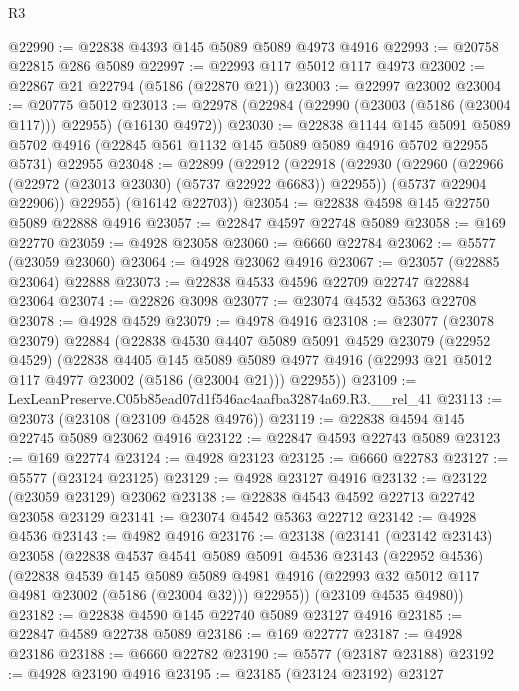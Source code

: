 \begin{lexlean}{R3}
\begin{coremodule}
@22990 := @22838 @4393 @145 @5089 @5089 @4973 @4916
@22993 := @20758 @22815 @286 @5089
@22997 := @22993 @117 @5012 @117 @4973
@23002 := @22867 @21 @22794 (@5186 (@22870 @21))
@23003 := @22997 @23002
@23004 := @20775 @5012
@23013 := @22978 (@22984 (@22990 (@23003 (@5186 (@23004 @117))) @22955) (@16130 @4972))
@23030 := @22838
    @1144
    @145
    @5091
    @5089
    @5702
    @4916
    (@22845 @561 @1132 @145 @5089 @5089 @4916 @5702 @22955 @5731)
    @22955
@23048 := @22899
    (@22912
      (@22918
        (@22930
          (@22960 (@22966 (@22972 (@23013 @23030) (@5737 @22922 @6683)) @22955))
          (@5737 @22904 @22906))
        @22955)
      (@16142 @22703))
@23054 := @22838 @4598 @145 @22750 @5089 @22888 @4916
@23057 := @22847 @4597 @22748 @5089
@23058 := @169 @22770
@23059 := @4928 @23058
@23060 := @6660 @22784
@23062 := @5577 (@23059 @23060)
@23064 := @4928 @23062 @4916
@23067 := @23057 (@22885 @23064) @22888
@23073 := @22838 @4533 @4596 @22709 @22747 @22884 @23064
@23074 := @22826 @3098
@23077 := @23074 @4532 @5363 @22708
@23078 := @4928 @4529
@23079 := @4978 @4916
@23108 := @23077
    (@23078 @23079)
    @22884
    (@22838
      @4530
      @4407
      @5089
      @5091
      @4529
      @23079
      (@22952 @4529)
      (@22838
        @4405
        @145
        @5089
        @5089
        @4977
        @4916
        (@22993 @21 @5012 @117 @4977 @23002 (@5186 (@23004 @21)))
        @22955))
@23109 := LexLeanPreserve.C05b85ead07d1f546ac4aafba32874a69.R3.__rel_41
@23113 := @23073 (@23108 (@23109 @4528 @4976))
@23119 := @22838 @4594 @145 @22745 @5089 @23062 @4916
@23122 := @22847 @4593 @22743 @5089
@23123 := @169 @22774
@23124 := @4928 @23123
@23125 := @6660 @22783
@23127 := @5577 (@23124 @23125)
@23129 := @4928 @23127 @4916
@23132 := @23122 (@23059 @23129) @23062
@23138 := @22838 @4543 @4592 @22713 @22742 @23058 @23129
@23141 := @23074 @4542 @5363 @22712
@23142 := @4928 @4536
@23143 := @4982 @4916
@23176 := @23138
    (@23141
      (@23142 @23143)
      @23058
      (@22838
        @4537
        @4541
        @5089
        @5091
        @4536
        @23143
        (@22952 @4536)
        (@22838
          @4539
          @145
          @5089
          @5089
          @4981
          @4916
          (@22993 @32 @5012 @117 @4981 @23002 (@5186 (@23004 @32)))
          @22955))
      (@23109 @4535 @4980))
@23182 := @22838 @4590 @145 @22740 @5089 @23127 @4916
@23185 := @22847 @4589 @22738 @5089
@23186 := @169 @22777
@23187 := @4928 @23186
@23188 := @6660 @22782
@23190 := @5577 (@23187 @23188)
@23192 := @4928 @23190 @4916
@23195 := @23185 (@23124 @23192) @23127

\end{coremodule}
\end{lexlean}
